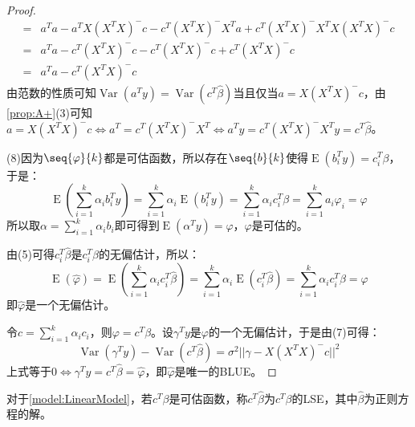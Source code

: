 \begin{proof}
\begin{align*}
		=&a^Ta-a^TX(X^TX)^-c-c^T(X^TX)^-X^Ta+c^T(X^TX)^-X^TX(X^TX)^-c \\
		=&a^Ta-c^T(X^TX)^-c-c^T(X^TX)^-c+c^T(X^TX)^-c \\
		=&a^Ta-c^T(X^TX)^-c
	\end{align*}
	由范数的性质可知$\operatorname{Var}(a^Ty)=\operatorname{Var}(c^T\hat{\beta})$当且仅当$a=X(X^TX)^-c$，由\cref{prop:A+}(3)可知$a=X(X^TX)^-c\Leftrightarrow a^T=c^T(X^TX)^-X^T\Leftrightarrow a^Ty=c^T(X^TX)^-X^Ty=c^T\hat{\beta}$。\par
	(8)因为$\seq{\varphi}{k}$都是可估函数，所以存在$\seq{b}{k}$使得$\operatorname{E}(b_i^Ty)=c_i^T\beta$，于是：
	\begin{equation*}
		\operatorname{E}\left(\sum_{i=1}^{k}\alpha_ib_i^Ty\right)=\sum_{i=1}^{k}\alpha_i\operatorname{E}(b_i^Ty)=\sum_{i=1}^{k}\alpha_ic_i^T\beta=\sum_{i=1}^{k}a_i\varphi_i=\varphi
	\end{equation*}
	所以取$\alpha=\sum\limits_{i=1}^{k}\alpha_ib_i$即可得到$\operatorname{E}(\alpha^Ty)=\varphi$，$\varphi$是可估的。\par
	由(5)可得$c_i^T\hat{\beta}$是$c_i^T\beta$的无偏估计，所以：
	\begin{equation*}
		\operatorname{E}(\hat{\varphi})=\operatorname{E}\left(\sum_{i=1}^{k}\alpha_ic_i^T\hat{\beta}\right)=\sum_{i=1}^{k}\alpha_i\operatorname{E}(c_i^T\hat{\beta})=\sum_{i=1}^{k}\alpha_ic_i^T\beta=\varphi
	\end{equation*}
	即$\hat{\varphi}$是一个无偏估计。\par
	令$c=\sum\limits_{i=1}^{k}\alpha_ic_i$，则$\varphi=c^T\beta$。设$\gamma^Ty$是$\varphi$的一个无偏估计，于是由(7)可得：
	\begin{equation*}
		\operatorname{Var}(\gamma^Ty)-\operatorname{Var}(c^T\hat{\beta})=\sigma^2||\gamma-X(X^TX)^-c||^2
	\end{equation*}
	上式等于$0\Leftrightarrow \gamma^Ty=c^T\hat{\beta}=\hat{\varphi}$，即$\hat{\varphi}$是唯一的BLUE。
\end{proof}
\begin{definition}
	对于\cref{model:LinearModel}，若$c^T\beta$是可估函数，称$c^T\hat{\beta}$为$c^T\beta$的LSE，其中$\hat{\beta}$为正则方程的解。
\end{definition}
